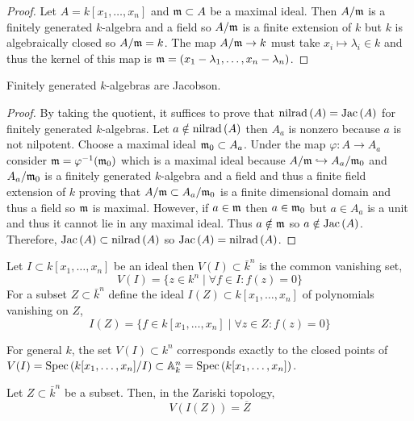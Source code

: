 \documentclass[12pt]{article}
\begin{document}
\begin{proof}
Let $A = k[x_1, \dots, x_n]$ and $\mathfrak{m} \subset A$ be a maximal ideal. Then $A / \mathfrak{m}$ is a finitely generated $k$-algebra and a field so $A / \mathfrak{m}$ is a finite extension of $k$ but $k$ is algebraically closed so $A / \mathfrak{m} = k$. The map $A / \mathfrak{m} \to k$ must take $x_i \mapsto \lambda_i \in k$ and thus the kernel of this map is $\mathfrak{m} = (x_1 - \lambda_1, \dots, x_n - \lambda_n)$. 
\end{proof}

\begin{theorem}
Finitely generated $k$-algebras are Jacobson.
\end{theorem}

\begin{proof}
By taking the quotient, it suffices to prove that $\mathrm{nilrad}\left( A \right) = \mathrm{Jac}\left( A \right)$ for finitely generated $k$-algebras. Let $a \notin \mathrm{nilrad}\left( A \right)$ then $A_a$ is nonzero because $a$ is not nilpotent. Choose a maximal ideal $\mathfrak{m}_0 \subset A_a$. Under the map $\varphi : A \to A_a$ consider $\mathfrak{m} = \varphi^{-1}(\mathfrak{m}_0)$ which is a maximal ideal because $A/\mathfrak{m} \hookrightarrow A_a / \mathfrak{m}_0$ and $A_a / \mathfrak{m}_0$ is a finitely generated $k$-algebra and a field and thus a finite field extension of $k$ proving that $A / \mathfrak{m} \subset A_a / \mathfrak{m}_0$ is a finite dimensional domain and thus a field so $\mathfrak{m}$ is maximal. However, if $a \in \mathfrak{m}$ then $a \in \mathfrak{m}_0$ but $a \in A_a$ is a unit and thus it cannot lie in any maximal ideal. Thus $a \notin \mathfrak{m}$ so $a \notin \mathrm{Jac}\left( A \right)$. Therefore, $\mathrm{Jac}\left( A \right) \subset \mathrm{nilrad}\left( A \right)$ so $\mathrm{Jac}\left( A \right) = \mathrm{nilrad}\left( A \right)$.
\end{proof}

\begin{definition}
Let $I \subset k[x_1, \dots, x_n]$ be an ideal then $V(I) \subset \bar{k}^n$ is the common vanishing set,
\[ V(I) = \{ z \in k^n \mid \forall f \in I : f(z) = 0 \} \]
For a subset $Z \subset \bar{k}^n$ define the ideal $I(Z) \subset k[x_1, \dots, x_n]$ of polynomials vanishing on $Z$,
\[ I(Z) = \{ f \in k[x_1, \dots, x_n] \mid \forall z \in Z : f(z) = 0 \} \]
\end{definition}

\begin{remark}
For general $k$, the set $V(I) \subset k^n$ corresponds exactly to the closed points of $V(I) = \mathrm{Spec}\left( k[x_1, \dots, x_n]/I \right) \subset \mathbb{A}^n_k = \mathrm{Spec}\left( k[x_1, \dots, x_n] \right)$. 
\end{remark}

\begin{prop}
Let $Z \subset \bar{k}^n$ be a subset. Then, in the Zariski topology,
\[ V(I(Z)) = \overline{Z} \]
\end{prop}
\end{document}
